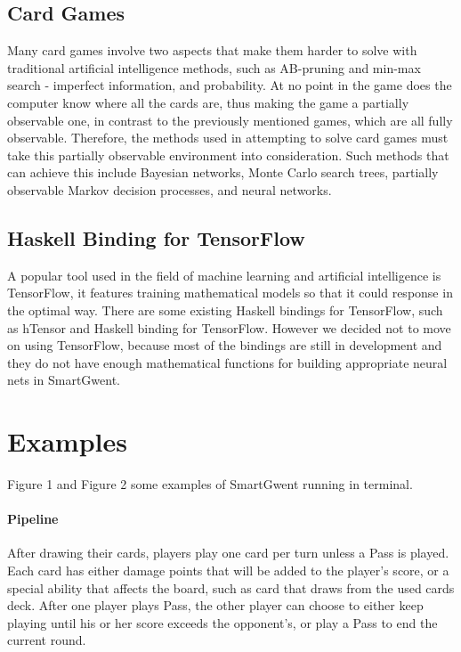 \documentclass[numbers]{sigplanconf}
\begin{document}
\subsection{Card Games}
Many card games involve two aspects that make them harder to solve with traditional artificial intelligence methods, such as AB-pruning and min-max search - imperfect information, and probability. At no point in the game does the computer know where all the cards are, thus making the game a partially observable one, in contrast to the previously mentioned games, which are all fully observable. Therefore, the methods used in attempting to solve card games must take this partially observable environment into consideration. Such methods that can achieve this include Bayesian networks, Monte Carlo search trees, partially observable Markov decision processes, and neural networks\cite{russell2003artificial}.


\subsection{Haskell Binding for TensorFlow}
A popular tool used in the field of machine learning and artificial intelligence is TensorFlow, it features training mathematical models so that it could response in the optimal way. There are some existing Haskell bindings for TensorFlow, such as hTensor and Haskell binding for TensorFlow. However we decided not to move on using TensorFlow, because most of the bindings are still in development and they do not have enough mathematical functions for building appropriate neural nets in SmartGwent.


\section{Examples}
Figure 1 and Figure 2 some examples of SmartGwent running in terminal. 
\paragraph{Pipeline}
After drawing their cards,  players play one card per turn unless a Pass is played. Each card has either damage points that will be added to the player's score, or a special ability that affects the board, such as card that draws from the used cards deck. After one player plays Pass, the other player can choose to either keep playing until his or her score exceeds the opponent's, or play a Pass to end the current round.
\end{document}
